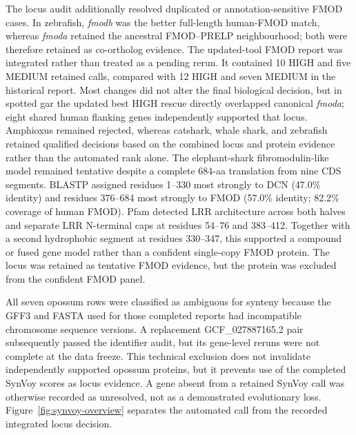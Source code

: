 The locus audit additionally resolved duplicated or annotation-sensitive FMOD
cases. In zebrafish, \textit{fmodb} was the better full-length human-FMOD match,
whereas \textit{fmoda} retained the ancestral FMOD--PRELP neighbourhood; both
were therefore retained as co-ortholog evidence. The updated-tool FMOD report
was integrated rather than treated as a pending rerun. It contained 10 HIGH and
five MEDIUM retained calls, compared with 12 HIGH and seven MEDIUM in the
historical report. Most changes did not alter the final biological decision,
but in spotted gar the updated best HIGH rescue directly overlapped canonical
\textit{fmoda}; eight shared human flanking genes independently supported that
locus. Amphioxus remained rejected, whereas catshark, whale shark, and
zebrafish retained qualified decisions based on the combined locus and protein
evidence rather than the automated rank alone. The elephant-shark
fibromodulin-like model remained
tentative despite a complete 684-aa translation from nine CDS segments. BLASTP
assigned residues 1--330 most strongly to DCN (47.0\% identity) and residues
376--684 most strongly to FMOD (57.0\% identity; 82.2\% coverage of human
FMOD). Pfam detected LRR architecture across both halves and separate LRR
N-terminal caps at residues 54--76 and 383--412. Together with a second
hydrophobic segment at residues 330--347, this supported a compound or fused
gene model rather than a confident single-copy FMOD protein. The locus was
retained as tentative FMOD evidence, but the protein was excluded from the
confident FMOD panel.

All seven opossum rows were classified as ambiguous for synteny because the
GFF3 and FASTA used for those completed reports had incompatible chromosome
sequence versions. A replacement GCF\_027887165.2 pair subsequently passed the
identifier audit, but its gene-level reruns were not complete at the data
freeze. This technical exclusion does not invalidate independently supported
opossum proteins, but it prevents use of the completed SynVoy scores as locus
evidence.
A gene absent from a retained SynVoy call was otherwise recorded as unresolved,
not as a demonstrated evolutionary loss. Figure~\ref{fig:synvoy-overview}
separates the automated call from the recorded integrated locus decision.

